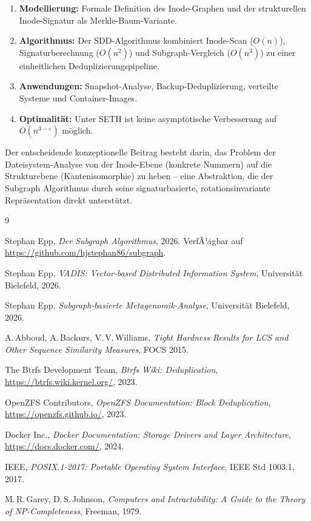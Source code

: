 ﻿\documentclass[a4paper,12pt]{article}
\theoremstyle{definition}
\begin{document}
\begin{enumerate}
    \item \textbf{Modellierung:} Formale Definition des Inode-Graphen und
          der strukturellen Inode-Signatur als Merkle-Baum-Variante.
    \item \textbf{Algorithmus:} Der SDD-Algorithmus kombiniert
          Inode-Scan ($O(n)$), Signaturberechnung ($O(n^2)$) und
          Subgraph-Vergleich ($O(n^3)$) zu einer einheitlichen
          Deduplizierungspipeline.
    \item \textbf{Anwendungen:} Snapshot-Analyse, Backup-Deduplizierung,
          verteilte Systeme und Container-Images.
    \item \textbf{Optimalit\"at:} Unter SETH ist keine asymptotische
          Verbesserung auf $O(n^{3-\varepsilon})$ m\"oglich.
\end{enumerate}

Der entscheidende konzeptionelle Beitrag besteht darin, das Problem der
Dateisystem-Analyse von der Inode-Ebene (konkrete Nummern) auf die
Strukturebene (Kantenisomorphie) zu heben -- eine Abstraktion, die der
Subgraph Algorithmus durch seine signaturbasierte, rotationsinvariante
Repr\"asentation direkt unterst\"utzt.

\begin{thebibliography}{9}

    Stephan Epp,
    \textit{Der Subgraph Algorithmus}, 2026. VerfÃ¼gbar auf \url{https://github.com/hjstephan86/subgraph}.

    Stephan Epp,
    \textit{VADIS: Vector-based Distributed Information System},
    Universit\"at Bielefeld, 2026.

    Stephan Epp,
    \textit{Subgraph-basierte Metagenomik-Analyse},
    Universit\"at Bielefeld, 2026.

    A.\,Abboud, A.\,Backurs, V.\,V.\,Williams,
    \textit{Tight Hardness Results for LCS and Other Sequence Similarity
    Measures},
    FOCS 2015.

    The Btrfs Development Team,
    \textit{Btrfs Wiki: Deduplication},
    \url{https://btrfs.wiki.kernel.org/}, 2023.

    OpenZFS Contributors,
    \textit{OpenZFS Documentation: Block Deduplication},
    \url{https://openzfs.github.io/}, 2023.

    Docker Inc.,
    \textit{Docker Documentation: Storage Drivers and Layer Architecture},
    \url{https://docs.docker.com/}, 2024.

    IEEE,
    \textit{POSIX.1-2017: Portable Operating System Interface},
    IEEE Std 1003.1, 2017.

    M.\,R.\,Garey, D.\,S.\,Johnson,
    \textit{Computers and Intractability: A Guide to the Theory of
    NP-Completeness},
    Freeman, 1979.

\end{thebibliography}
\end{document}
